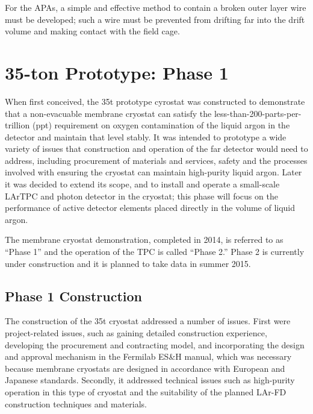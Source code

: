 For the APAs, a simple and effective method to contain a broken outer layer wire must be developed; such a wire must be prevented from drifting far into the drift volume and making contact with the field cage.
 

\section{35-ton Prototype: Phase 1}
\label{35tonprototype}

When first conceived, the 35t prototype cyrostat was constructed to demonstrate that a non-evacuable membrane cryostat can satisfy the less-than-200-parts-per-trillion (ppt) requirement on oxygen contamination of the liquid argon in the detector and maintain that level stably.
%
It was intended to prototype a wide variety of issues that construction and 
operation of the far detector would need to address, including procurement of 
materials and services, safety and the processes involved with ensuring the 
cryostat can maintain high-purity liquid argon. 
%
Later it was decided to extend its scope, and to install and operate a small-scale LArTPC and photon detector in the cryostat; this phase will focus on the performance of active detector elements placed directly in the volume of liquid argon.

The membrane cryostat demonstration, completed in 2014, is referred to as ``Phase 1'' and the operation of the TPC is called ``Phase 2.''
Phase 2 is currently under construction and it is planned to take data in summer 2015.



\subsection{Phase 1 Construction}
\label{sec:rnd:35t1:construction}

The construction of the 35t cryostat addressed a number of issues.
First were project-related issues, such as gaining detailed construction experience, 
developing the procurement and contracting model, and incorporating the design and approval mechanism 
in the Fermilab ES\&H manual, which was necessary because membrane cryostats are designed in accordance
with European and Japanese standards.
Secondly, it addressed technical issues such as %
high-purity operation in this type of 
cryostat and the suitability of the planned LAr-FD construction techniques and materials.

